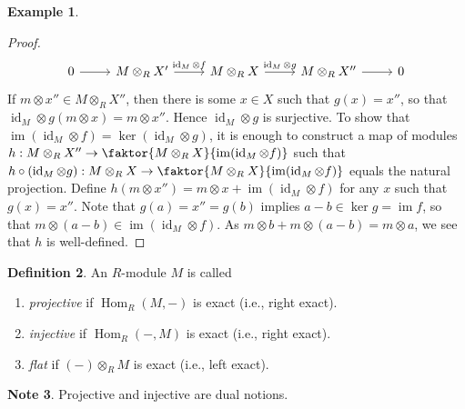 \documentclass[10pt,letterpaper,cm]{nupset}
\theoremstyle{definition}
\newtheorem{definition}{Definition}[subsection]
\newtheorem{exmp}[definition]{Example}
\newtheorem{note}[definition]{Note}
\theoremstyle{theorem}
\theoremstyle{remark}
\newcommand{\1}{\mathbf{1}}
\newcommand{\0}{\vec 0}
\DeclareMathOperator{\id}{id}
\DeclareMathOperator{\im}{im}
\DeclareMathOperator{\Hom}{Hom}
\begin{document}
\begin{exmp}
\begin{enumerate}
\begin{proof}
\[
\begin{tikzcd}
0 \arrow[r] & M\otimes_R X' \arrow[r, "\id_M \otimes f"] & M\otimes_R X \arrow[r, "\id_M \otimes g"] & M\otimes_R X'' \arrow[r] & 0
\end{tikzcd}
\]
If $ m \otimes x'' \in M \otimes_R X''$, then there is some $x \in X$ such that $g(x) = x''$, so that $\id_M \otimes g(m \otimes x) = m\otimes x''$. Hence $\id_M \otimes g$ is surjective. To show that $\im(\id_M \otimes f) = \ker (\id_M \otimes g)$, it is enough to construct a map of modules $h: M \otimes_R X'' \to \faktor{M \otimes_R X}{\im(\id_M \otimes f)}$ such that $h\circ (\id_M \otimes g) : M\otimes_R X \to \faktor{M \otimes_R X}{\im(\id_M \otimes f)}$ equals the natural projection. Define $h(m\otimes x'') = m \otimes x + \im(\id_M \otimes f)$ for any $x$ such that $g(x) = x''$. Note that $g(a) = x'' = g(b)$ implies $a-b \in \ker g = \im f$, so that $m \otimes (a-b) \in \im(\id_M \otimes f)$. As $m\otimes b + m \otimes (a-b) = m\otimes a$, we see that $h$ is well-defined.
\end{proof}
\end{enumerate}
\end{exmp}

\begin{definition} An $R$-module $M$ is called
\begin{enumerate}
\item \textit{projective} if $\Hom_R(M, -)$ is exact (i.e., right exact).
\item \textit{injective} if $\Hom_R(-, M)$ is exact (i.e., right exact).
\item \textit{flat} if $(-) \otimes_R M$ is exact (i.e., left exact).
\end{enumerate}
\end{definition}

\begin{note}
Projective and injective are dual notions.
\end{note}
\end{document}
